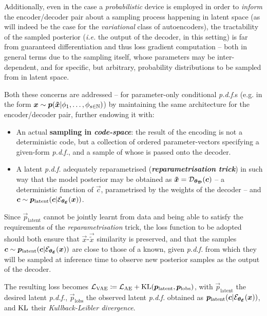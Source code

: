 Additionally, even in the case a \textit{probabilistic} device is employed in order to \textit{inform} the encoder/decoder pair about a sampling process happening in latent space (as will indeed be the case for the \textit{variational} class of autoencoders), the tractability of the sampled posterior (\textit{i.e.} the output of the decoder, in this setting) is far from guaranteed \wrt differentiation and thus loss gradient computation -- both in general terms due to the sampling itself, whose parameters may be inter-dependent, and for specific, but arbitrary, probability distributions to be sampled from in latent space.

Both these concerns are addressed -- for parameter-only conditional \textit{p.d.f.}s (e.g. in the form $\bm{x} \sim \bm{p}(\bm{\tilde{x}} | \phi_1, \dots, \phi_{s\in\mathbb{N}})$) by maintaining the same architecture for the encoder/decoder pair, further endowing it with:
\begin{itemize}
    \item An actual \textbf{sampling in \textit{code-space}}: the result of the encoding is not a deterministic code, but a collection of ordered parameter-vectors specifying a given-form \textit{p.d.f.}, and a sample of whose is passed onto the decoder.
    \item A latent \textit{p.d.f.} adequately reparametrised (\textbf{\textit{reparametrisation trick}}) in such way that the model posterior may be obtained as $\bm{\tilde{x}} = \mathcal{D}_{\bm{\theta_{\mathcal{D}}}}(\bm{c})$ -- a deterministic function of $\vec{c}$, parametrised by the weights of the decoder -- and $\bm{c} \sim \bm{p}_{\text{latent}}(\bm{c}| \mathcal{E}_{\bm{\theta_{\mathcal{E}}}}(\bm{x}))$.
\end{itemize}

Since $\vec{p}_{\text{latent}}$ cannot be jointly learnt from data and being able to satisfy the requirements of the \textit{reparametrisation} trick, the loss function to be adopted should both ensure that $\vec{x}$-$\vec{\tilde{x}}$ similarity is preserved, and that the samples $\bm{c} \sim \bm{p}_{\text{latent}}(\bm{c}| \mathcal{E}_{\bm{\theta_{\mathcal{E}}}}(\bm{x}))$ are close to those of a known, given \textit{p.d.f.} from which they will be sampled at inference time to observe new posterior samples as the output of the decoder.

The resulting loss becomes $\mathcal{L}_{\text{VAE}} \coloneqq \mathcal{L}_{\text{AE}} + \operatorname*{\text{KL}}(\bm{p}_{\text{latent}},\bm{p}_{\text{lobs}})$, with $\vec{p}_{\text{latent}}$ the desired latent \textit{p.d.f.}, $\vec{p}_{\text{lobs}}$ the observed latent \textit{p.d.f.} obtained as $\bm{p}_{\text{latent}}(\bm{c}| \mathcal{E}_{\bm{\theta_{\mathcal{E}}}}(\bm{x}))$, and $\operatorname*{\text{KL}}$ their \textit{Kullback-Leibler divergence}.

